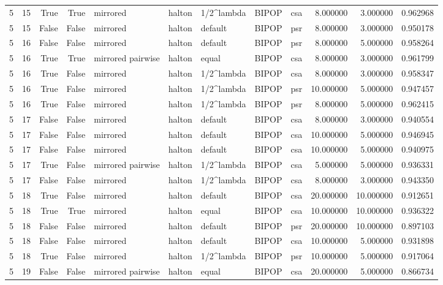 \begin{tabular}{rrrrlllllrrr}
5 & 15 & True & True & mirrored & halton & 1/2^lambda & BIPOP & csa & 8.000000 & 3.000000 & 0.962968 \\
5 & 15 & False & False & mirrored & halton & default & BIPOP & psr & 8.000000 & 3.000000 & 0.950178 \\
5 & 16 & False & False & mirrored & halton & default & BIPOP & psr & 8.000000 & 5.000000 & 0.958264 \\
5 & 16 & True & True & mirrored pairwise & halton & equal & BIPOP & csa & 8.000000 & 3.000000 & 0.961799 \\
5 & 16 & True & False & mirrored & halton & 1/2^lambda & BIPOP & csa & 8.000000 & 3.000000 & 0.958347 \\
5 & 16 & True & False & mirrored & halton & 1/2^lambda & BIPOP & psr & 10.000000 & 5.000000 & 0.947457 \\
5 & 16 & True & False & mirrored & halton & 1/2^lambda & BIPOP & psr & 8.000000 & 5.000000 & 0.962415 \\
5 & 17 & False & False & mirrored & halton & default & BIPOP & csa & 8.000000 & 3.000000 & 0.940554 \\
5 & 17 & False & False & mirrored & halton & default & BIPOP & csa & 10.000000 & 5.000000 & 0.946945 \\
5 & 17 & False & False & mirrored & halton & default & BIPOP & csa & 10.000000 & 5.000000 & 0.940975 \\
5 & 17 & True & False & mirrored pairwise & halton & 1/2^lambda & BIPOP & csa & 5.000000 & 5.000000 & 0.936331 \\
5 & 17 & False & False & mirrored & halton & 1/2^lambda & BIPOP & csa & 8.000000 & 3.000000 & 0.943350 \\
5 & 18 & True & False & mirrored & halton & default & BIPOP & csa & 20.000000 & 10.000000 & 0.912651 \\
5 & 18 & True & True & mirrored & halton & equal & BIPOP & csa & 10.000000 & 10.000000 & 0.936322 \\
5 & 18 & False & False & mirrored & halton & default & BIPOP & psr & 20.000000 & 10.000000 & 0.897103 \\
5 & 18 & False & False & mirrored & halton & default & BIPOP & csa & 10.000000 & 5.000000 & 0.931898 \\
5 & 18 & True & False & mirrored & halton & 1/2^lambda & BIPOP & psr & 10.000000 & 5.000000 & 0.917064 \\
5 & 19 & False & False & mirrored pairwise & halton & equal & BIPOP & csa & 20.000000 & 5.000000 & 0.866734 \\

\end{tabular}
